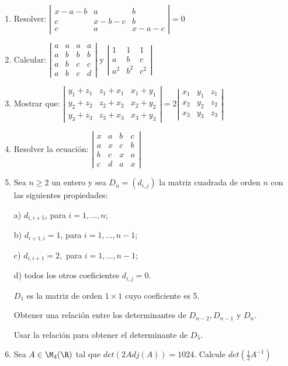 \begin{enumerate}
\item
Resolver:
$\left|
\begin{array}{ccc}
x-a-b &a & b\\
c & x-b-c & b\\
c & a & x-a-c
\end{array}
\right|
=0
$
\item
Calcular:
$\left|
\begin{array}{cccc}
a & a & a   & a\\
a &  b & b  &  b\\
a &  b & c  &  c\\
a &  b & c  &d
\end{array}
\right|
$
y
$\left|
\begin{array}{ccc}
1 & 1 & 1\\
a & b &c\\
a^2 & b^2 & c^2
\end{array}
\right|
$
\item
Mostrar que:
$\left|
\begin{array}{ccc}
y_1+ z_1& z_1+ x_1 & x_1+y_1\\
y_2+ z_2& z_2+ x_2 & x_2+y_2\\
y_3+ z_3& z_3+ x_3 & x_3+y_3
\end{array}
\right|
=
2\left|
\begin{array}{ccc}
x_1 & y_1 & z_1\\
x_2 & y_2 & z_2\\
x_3 & y_3 & z_3
\end{array}
\right|
$

\item
Resolver la ecuación:
$\left|
\begin{array}{cccc}
x & a & b  &c\\
a & x & c  &b\\
b & c & x  &a\\
c & d & a  &x
\end{array}
\right|
$

\item
Sea $n\geq 2$ un entero y sea $D_n =(d_{i,j})$ la matriz cuadrada de 
orden $n$ con las siguientes propiedades:

a) $d_{i,i+5}$, para $i=1, ..., n$;

b) $d_{i+1,i}= 1$, para $i=1, ..., n-1$;

c) $d_{i,i+1}=2,$ para $i=1, ..., n-1$;

d) todos los otros coeficientes $d_{i,j} =  0$.

$D_1$ es la matriz de orden $1\times  1$ cuyo coeficiente es 5.

Obtener una relación entre los determinantes de $D_{n-2}, D_{n-1}$ y $D_n$.

Usar la relación para obtener el determinante de $D_5$.

\item
Sea $A\in \M_4(\R)$ tal que $det(2Adj(A)) = 1024$.
 Calcule $det(\frac{1}{2}A^{-1})$

\end{enumerate}


